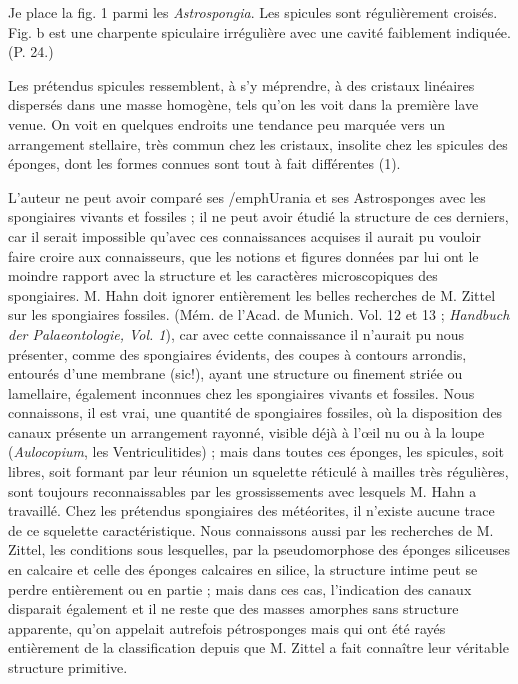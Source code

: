 \documentclass[a4paper, 12pt, oneside, french]{article}
\begin{document}
\og Je place la fig. 1 parmi les \emph{Astrospongia}. Les spicules sont régulièrement croisés. Fig. b est une charpente spiculaire irrégulière avec une cavité faiblement indiquée. \fg (P. 24.)

Les prétendus spicules ressemblent, à s'y méprendre, à des cristaux linéaires dispersés dans une masse homogène, tels qu'on les voit dans la première lave venue. On voit en quelques endroits une tendance peu marquée vers un arrangement stellaire, très commun chez les cristaux, insolite chez les spicules des éponges, dont les formes connues sont tout à fait différentes (1).

L'auteur ne peut avoir comparé ses /emph{Urania} et ses Astrosponges avec les spongiaires vivants et fossiles ; il ne peut avoir étudié la structure de ces derniers, car il serait impossible qu'avec ces connaissances acquises il aurait pu vouloir faire croire aux connaisseurs, que les notions et figures données par lui ont le moindre rapport avec la structure et les caractères microscopiques des spongiaires. M. Hahn doit ignorer entièrement les belles recherches de M. Zittel sur les spongiaires fossiles. (Mém. de l'Acad. de Munich. Vol. 12 et 13 ; \emph{Handbuch der Palaeontologie, Vol. 1}), car avec cette connaissance il n'aurait pu nous présenter, comme des spongiaires évidents, des coupes à contours arrondis, entourés d'une membrane (sic!), ayant une structure ou finement striée ou lamellaire, également inconnues chez les spongiaires vivants et fossiles. Nous connaissons, il est vrai, une quantité de spongiaires fossiles, où la disposition des canaux présente un arrangement rayonné, visible déjà à l'œil nu ou à la loupe (\emph{Aulocopium}, les Ventriculitides) ; mais dans toutes ces éponges, les spicules, soit libres, soit formant par leur réunion un squelette réticulé à mailles très régulières, sont toujours reconnaissables par les grossissements avec lesquels M. Hahn a travaillé. Chez les prétendus spongiaires des météorites, il n'existe aucune trace de ce squelette caractéristique. Nous connaissons aussi par les recherches de M. Zittel, les conditions sous lesquelles, par la pseudomorphose des éponges siliceuses en calcaire et celle des éponges calcaires en silice, la structure intime peut se perdre entièrement ou en partie ; mais dans ces cas, l'indication des canaux disparait également et il ne reste que des masses amorphes sans structure apparente, qu'on appelait autrefois \og pétrosponges \fg mais qui ont été rayés entièrement de la classification depuis que M. Zittel a fait connaître leur véritable structure primitive.
\end{document}
